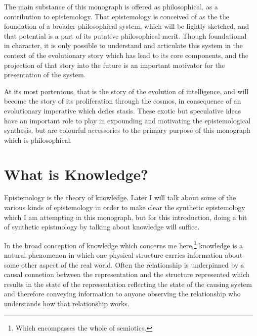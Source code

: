 The main substance of this monograph is offered as philosophical, as a contribution to epistemology.
That epistemology is conceived of as the the foundation of a broader philosophical system, which will be lightly sketched, and that potential is a part of its putative philosophical merit.
Though foundational in character, it is only possible to understand and articulate this system in the context of the evolutionary story which has lead to its core components, and the projection of that story into the future is an important motivator for the presentation of the system.

At its most portentous, that is the story of the evolution of intelligence, and will become the story of its proliferation through the cosmos, in consequence of an evolutionary imperative which defies stasis.
These exotic but speculative ideas have an important role to play in expounding and motivating the epistemological synthesis, but are colourful accessories to the primary purpose of this monograph which is philosophical.


\section{What is Knowledge?}

Epistemology is the theory of knowledge.
Later I will talk about some of the various kinds of epistemology in order to make clear the synthetic epistemology which I am attempting in this monograph, but for this introduction, doing a bit of synthetic epistmology by talking about knowledge will suffice.

In the broad conception of knowledge which concerns me here,\footnote{Which encompasses the whole of semiotics.} knowledge is a natural phenomenon in which one physical structure carries information about some other aspect of the real world.
Often the relationship is underpinned by a causal connetion between the representation and the structure represented which results in the state of the representation reflecting the state of the causing system and therefore conveying information to anyone observing the relationship who understands how that relationship works.


